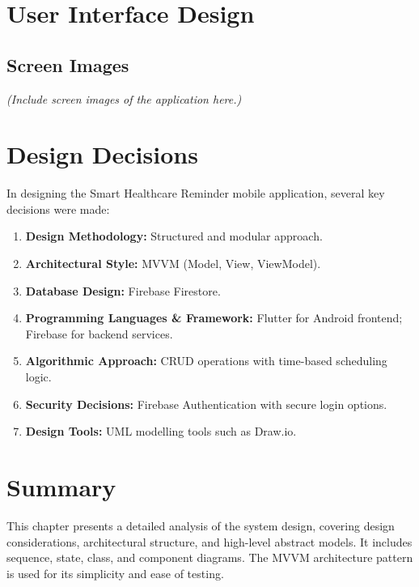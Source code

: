 \section{User Interface Design}
\subsection{Screen Images}
\textit{(Include screen images of the application here.)}

\section{Design Decisions}

In designing the Smart Healthcare Reminder mobile application, several key decisions were made:

\begin{enumerate}
    \item \textbf{Design Methodology:} Structured and modular approach.
    \item \textbf{Architectural Style:} MVVM (Model, View, ViewModel).
    \item \textbf{Database Design:} Firebase Firestore.
    \item \textbf{Programming Languages \& Framework:} Flutter for Android frontend; Firebase for backend services.
    \item \textbf{Algorithmic Approach:} CRUD operations with time-based scheduling logic.
    \item \textbf{Security Decisions:} Firebase Authentication with secure login options.
    \item \textbf{Design Tools:} UML modelling tools such as Draw.io.
\end{enumerate}

\section{Summary}

This chapter presents a detailed analysis of the system design, covering design considerations, architectural structure, and high-level abstract models. It includes sequence, state, class, and component diagrams. The MVVM architecture pattern is used for its simplicity and ease of testing.
